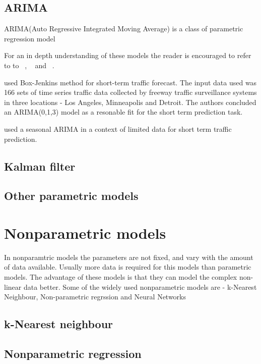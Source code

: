 \subsection{ARIMA}
ARIMA(Auto Regressive Integrated Moving Average) is a class of parametric regression model

For an in depth understanding of these models the reader is encouraged to refer to to
~\citet{tong1990non}, ~\citet{brockwell2006introduction} and ~\citet{box2015time}.


\citet{ahmed1979analysis} used Box-Jenkins method for short-term traffic forecast. The input data
used was 166 sets of time series traffic data collected by freeway traffic surveillance systems in
three locations - Los Angeles, Minneapolis and Detroit. The authors concluded an ARIMA(0,1,3) model
as a resonable fit for the short term prediction task.

\citet{kumar2015short} used a seasonal ARIMA in a context of limited data for short term traffic prediction.

\subsection{Kalman filter}

\subsection{Other parametric models}

\section{Nonparametric models}
In nonparamtric models the parameters are not fixed, and vary with the amount of data available.
Usually more data is required for this models than parametric models. The advantage of these models
is that they can model the complex non-linear data better. Some of the widely used nonparametric
models are - k-Nearest Neighbour, Non-parametric regrssion and Neural Networks

\subsection{k-Nearest neighbour}

\subsection{Nonparametric regression}

